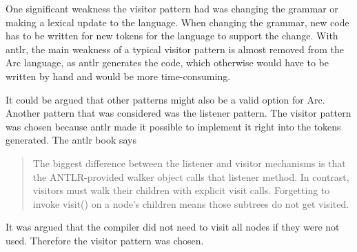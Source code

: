One significant weakness the visitor pattern had was changing the grammar or making a lexical update to the language. When changing the grammar, new code has to be written for new tokens for the language to support the change. With \gls{antlr}, the main weakness of a typical visitor pattern is almost removed from the Arc language, as \gls{antlr} generates the code, which otherwise would have to be written by hand and would be more time-consuming. 


It could be argued that other patterns might also be a valid option for Arc. Another pattern that was considered was the listener pattern. The visitor pattern was chosen because \gls{antlr} made it possible to implement it right into the tokens generated. The \gls{antlr} book says \begin{quote}
    The biggest difference between the listener and visitor mechanisms is that the ANTLR-provided walker object calls that listener method. In contrast, visitors must walk their children with explicit visit calls. Forgetting to invoke visit() on a node’s children means those subtrees do not get visited. \cite{Parr2014}
\end{quote}
It was argued that the compiler did not need to visit all nodes if they were not used. Therefore the visitor pattern was chosen.
 






